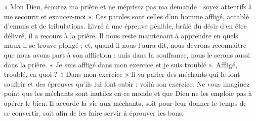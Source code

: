  « Mon Dieu, écoutez ma prière et ne méprisez pas ma demande : soyez attentifs à me secourir et exaucez-moi ». Ces paroles sont celles d’un homme affligé, accablé d’ennuis et de tribulations. Livré à une épreuve pénible, brûlé du désir d’en être délivré, il a recours à la prière. Il nous reste maintenant à apprendre en quels maux il se trouve plongé ; et, quand il nous l’aura dit, nous devrons reconnaître que nous avons part à son affliction : unis dans la souffrance, nous le serons aussi dans la prière. « Je suis affligé dans mon exercice et je suis troublé ». Affligé, troublé, en quoi ? « Dans mon exercice » Il va parler des méchants qui le font souffrir et des épreuves qu’ils lui font subir : voilà son exercice. Ne vous imaginez point que les méchants sont inutiles en ce monde et que Dieu ne les emploie pas à opérer le bien. Il accorde la vie aux méchants, soit pour leur donner le temps de se convertir, soit afin de les faire servir à éprouver les bons.